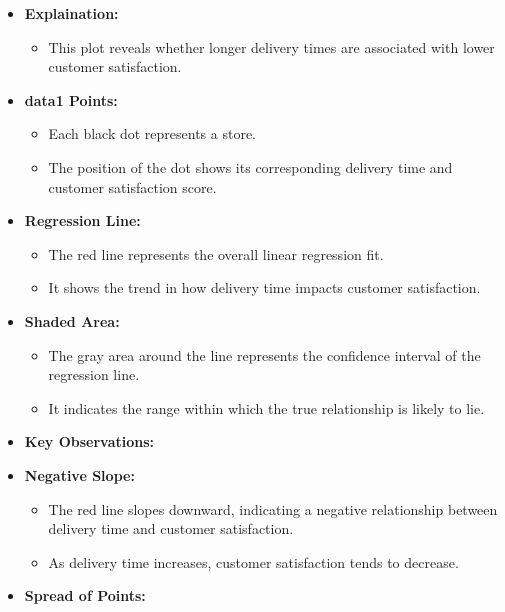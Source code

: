 \documentclass[
]{article}
\providecommand{\tightlist}{%
  \setlength{\itemsep}{0pt}\setlength{\parskip}{0pt}}
\begin{document}
\begin{itemize}
\item
  \textbf{Explaination:}

  \begin{itemize}
  \tightlist
  \item
    This plot reveals whether longer delivery times are associated with
    lower customer satisfaction.
  \end{itemize}
\item
  \textbf{data1 Points:}

  \begin{itemize}
  \tightlist
  \item
    Each black dot represents a store.
  \item
    The position of the dot shows its corresponding delivery time and
    customer satisfaction score.
  \end{itemize}
\item
  \textbf{Regression Line:}

  \begin{itemize}
  \tightlist
  \item
    The red line represents the overall linear regression fit.
  \item
    It shows the trend in how delivery time impacts customer
    satisfaction.
  \end{itemize}
\item
  \textbf{Shaded Area:}

  \begin{itemize}
  \tightlist
  \item
    The gray area around the line represents the confidence interval of
    the regression line.
  \item
    It indicates the range within which the true relationship is likely
    to lie.
  \end{itemize}
\item
  \textbf{Key Observations:}
\item
  \textbf{Negative Slope:}

  \begin{itemize}
  \tightlist
  \item
    The red line slopes downward, indicating a negative relationship
    between delivery time and customer satisfaction.
  \item
    As delivery time increases, customer satisfaction tends to decrease.
  \end{itemize}
\item
  \textbf{Spread of Points:}


\end{itemize}
\end{document}
